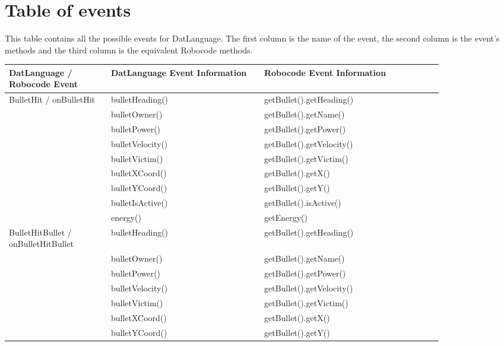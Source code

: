 \section{Table of events}
This table contains all the possible events for DatLanguage. The first column is the name of the event, the second column is the event's methods and the third column is the equivalent Robocode methods. 
\begin{center}
	\begin{tabular}{ | p{0.2\linewidth} | p{0.3\linewidth} | p{0.35\linewidth} |}
		\hline
		DatLanguage / Robocode Event& DatLanguage Event Information & Robocode Event Information \\ \hline
		BulletHit / onBulletHit& bulletHeading() & getBullet().getHeading() \\ \hline
		& bulletOwner() & getBullet().getName() \\ \hline
		& bulletPower() & getBullet().getPower() \\ \hline
		& bulletVelocity() & getBullet().getVelocity() \\ \hline
		& bulletVictim() & getBullet().getVictim() \\ \hline
		& bulletXCoord() & getBullet().getX() \\ \hline
		& bulletYCoord() & getBullet().getY() \\ \hline
		& bulletIsActive() & getBullet().isActive() \\ \hline
		& energy() & getEnergy() \\ \hline
		BulletHitBullet / onBulletHitBullet& bulletHeading() & getBullet().getHeading() \\ \hline
		& bulletOwner() & getBullet().getName() \\ \hline
		& bulletPower() & getBullet().getPower() \\ \hline
		& bulletVelocity() & getBullet().getVelocity() \\ \hline
		& bulletVictim() & getBullet().getVictim() \\ \hline
		& bulletXCoord() & getBullet().getX() \\ \hline
		& bulletYCoord() & getBullet().getY() \\ \hline
	\end{tabular}
	\label{fig:EventTable}
\end{center}		
		
